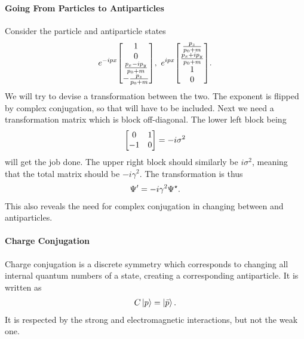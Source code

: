\paragraph{Going From Particles to Antiparticles}
Consider the particle and antiparticle states
\begin{align*}
	e^{-ipx}\mqty[
		1 \\
		0 \\
		\frac{p_{x} - ip_{y}}{p_{0} + m} \\
		-\frac{p_{	z}}{p_{0} + m}
	],\ e^{ipx}\mqty[
		\frac{p_{z}}{p_{0} + m} \\
		\frac{p_{x} + ip_{y}}{p_{0} + m} \\
		1 \\
		0
	].
\end{align*}
We will try to devise a transformation between the two. The exponent is flipped by complex conjugation, so that will have to be included. Next we need a transformation matrix which is block off-diagonal. The lower left block being
\begin{align*}
	\mqty[
		0  & 1 \\
		-1 & 0
	] = -i\sigma^{2}
\end{align*}
will get the job done. The upper right block should similarly be $i\sigma^{2}$, meaning that the total matrix should be $-i\gamma^{2}$. The transformation is thus
\begin{align*}
	\Psi^{\prime} = -i\gamma^{2}\Psi^{\star}.
\end{align*}
This also reveals the need for complex conjugation in changing between and antiparticles.

\paragraph{Charge Conjugation}
Charge conjugation is a discrete symmetry which corresponds to changing all internal quantum numbers of a state, creating a corresponding antiparticle. It is written as
\begin{align*}
	C\ket{p} = \ket{\bar{p}}.
\end{align*}
It is respected by the strong and electromagnetic interactions, but not the weak one.

